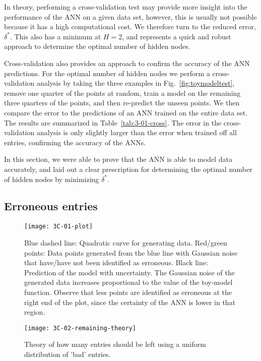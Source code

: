 \documentclass[review]{elsarticle}
\newcommand{\figref}[1]{Fig.~\ref{#1}}
\newcommand{\tabref}[1]{Table~\ref{#1}}
\newcommand{\change}[1]{#1}
\begin{document}
In theory, performing a cross-validation test may provide more insight into
the performance of the ANN on a given data set, however, this is usually not
possible because it has a high computational cost. We therefore turn to the
reduced error, $\delta^*$. This also has a minimum at $H=2$, and represents
a quick and robust approach to determine the optimal number of hidden nodes.

\change{Cross-validation also provides an approach to confirm the accuracy
  of the ANN predictions. For the optimal number of hidden nodes we perform
  a cross-validation analysis by taking the three examples in}
\figref{fig:toymodeltest}, \change{remove one quarter of the points at
  random, train a model on the remaining three quarters of the points, and
  then re-predict the unseen points. We then compare the error to the
  predictions of an ANN trained on the entire data set. The results are
  summarized in} \tabref{tab:3-01-cross}. \change{The error in the
  cross-validation analysis is only slightly larger than the error when
  trained off all entries, confirming the accuracy of the ANNs.}

In this section, we were able to prove that the ANN is able to model data
accurately, and laid out a clear prescription for determining the optimal
number of hidden nodes by minimizing $\delta^*$.

\subsection{Erroneous entries}\label{sec:ErroneousData}

\begin{figure}
 \centering
 \texttt{[image: 3C-01-plot]}
 \caption{Blue dashed line: Quadratic curve for generating data. Red/green
   points: Data points generated from the blue line with Gaussian noise that
   have/have not been identified as erroneous. Black line: Prediction of the
   model with uncertainty. The Gaussian noise of the generated data
   increases proportional to the value of the toy-model function. Observe
   that less points are identified as erroneous at the right end of the
   plot, since the certainty of the ANN is lower in that region.}
 \label{fig:3C-01-plot}
\end{figure}

\begin{figure}
 \centering
 \texttt{[image: 3C-02-remaining-theory]}
 \caption{Theory of how many entries should be left using a uniform 
   distribution of 'bad' entries.}
 \label{fig:3C-02-remaining-theory}
\end{figure}
\end{document}
